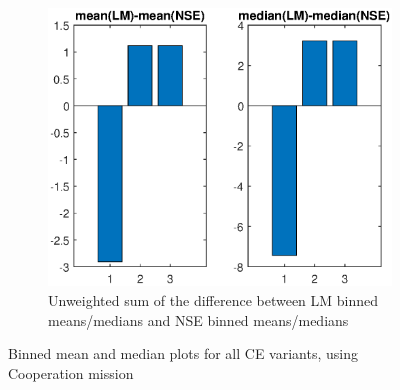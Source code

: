 \begin{figure}[ht]
\begin{subfigure}{0.50\linewidth}
\label{fig:flightCoopGoodMeanMed}
\end{subfigure}
\\
\begin{subfigure}{\linewidth}
\centering
\includegraphics[scale=0.6]{figures/flight_results/Coop_bar.eps}
\caption{Unweighted sum of the difference between LM binned means/medians and NSE binned means/medians}
\label{fig:flightCoopGoodUnweightSum}
\end{subfigure}
\caption{Binned mean and median plots for all CE variants, using Cooperation mission}
\label{fig:flightCoopMeanMed}
\end{figure}

